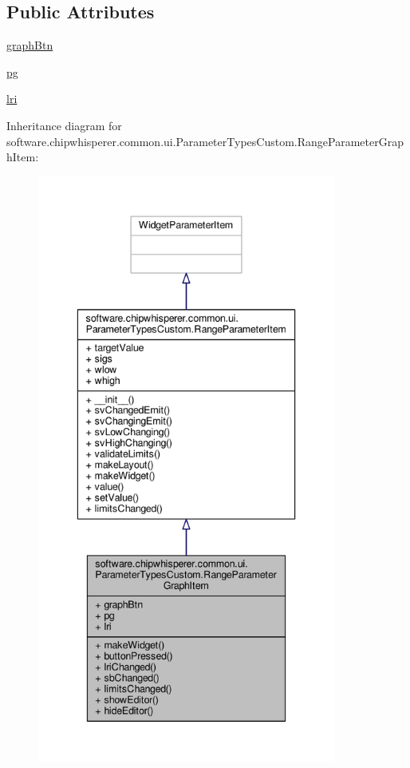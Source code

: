 \subsection*{Public Attributes}
\begin{DoxyCompactItemize}
\item 
\hyperlink{classsoftware_1_1chipwhisperer_1_1common_1_1ui_1_1ParameterTypesCustom_1_1RangeParameterGraphItem_a072d9c3bca88103a46be2ede21a10987}{graph\+Btn}
\item 
\hyperlink{classsoftware_1_1chipwhisperer_1_1common_1_1ui_1_1ParameterTypesCustom_1_1RangeParameterGraphItem_aa0c25b3ff82fd4aef7c8b7de706f578a}{pg}
\item 
\hyperlink{classsoftware_1_1chipwhisperer_1_1common_1_1ui_1_1ParameterTypesCustom_1_1RangeParameterGraphItem_a2823b892e982ff00f831bbe0b9dc1b6e}{lri}
\end{DoxyCompactItemize}


Inheritance diagram for software.\+chipwhisperer.\+common.\+ui.\+Parameter\+Types\+Custom.\+Range\+Parameter\+Graph\+Item\+:\nopagebreak
\begin{figure}[H]
\begin{center}
\leavevmode
\includegraphics[height=550pt]{de/d23/classsoftware_1_1chipwhisperer_1_1common_1_1ui_1_1ParameterTypesCustom_1_1RangeParameterGraphItem__inherit__graph}
\end{center}
\end{figure}


